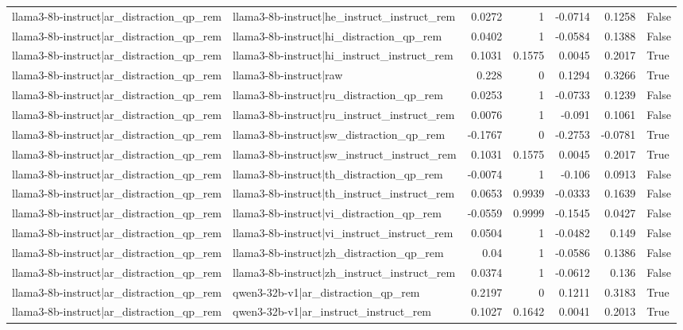 \begin{table}
\begin{tabular}{l l r r r r l}
llama3-8b-instruct|ar_distraction_qp_rem & llama3-8b-instruct|he_instruct_instruct_rem & 0.0272 & 1 & -0.0714 & 0.1258 & False \\
llama3-8b-instruct|ar_distraction_qp_rem & llama3-8b-instruct|hi_distraction_qp_rem & 0.0402 & 1 & -0.0584 & 0.1388 & False \\
llama3-8b-instruct|ar_distraction_qp_rem & llama3-8b-instruct|hi_instruct_instruct_rem & 0.1031 & 0.1575 & 0.0045 & 0.2017 & True \\
llama3-8b-instruct|ar_distraction_qp_rem & llama3-8b-instruct|raw & 0.228 & 0 & 0.1294 & 0.3266 & True \\
llama3-8b-instruct|ar_distraction_qp_rem & llama3-8b-instruct|ru_distraction_qp_rem & 0.0253 & 1 & -0.0733 & 0.1239 & False \\
llama3-8b-instruct|ar_distraction_qp_rem & llama3-8b-instruct|ru_instruct_instruct_rem & 0.0076 & 1 & -0.091 & 0.1061 & False \\
llama3-8b-instruct|ar_distraction_qp_rem & llama3-8b-instruct|sw_distraction_qp_rem & -0.1767 & 0 & -0.2753 & -0.0781 & True \\
llama3-8b-instruct|ar_distraction_qp_rem & llama3-8b-instruct|sw_instruct_instruct_rem & 0.1031 & 0.1575 & 0.0045 & 0.2017 & True \\
llama3-8b-instruct|ar_distraction_qp_rem & llama3-8b-instruct|th_distraction_qp_rem & -0.0074 & 1 & -0.106 & 0.0913 & False \\
llama3-8b-instruct|ar_distraction_qp_rem & llama3-8b-instruct|th_instruct_instruct_rem & 0.0653 & 0.9939 & -0.0333 & 0.1639 & False \\
llama3-8b-instruct|ar_distraction_qp_rem & llama3-8b-instruct|vi_distraction_qp_rem & -0.0559 & 0.9999 & -0.1545 & 0.0427 & False \\
llama3-8b-instruct|ar_distraction_qp_rem & llama3-8b-instruct|vi_instruct_instruct_rem & 0.0504 & 1 & -0.0482 & 0.149 & False \\
llama3-8b-instruct|ar_distraction_qp_rem & llama3-8b-instruct|zh_distraction_qp_rem & 0.04 & 1 & -0.0586 & 0.1386 & False \\
llama3-8b-instruct|ar_distraction_qp_rem & llama3-8b-instruct|zh_instruct_instruct_rem & 0.0374 & 1 & -0.0612 & 0.136 & False \\
llama3-8b-instruct|ar_distraction_qp_rem & qwen3-32b-v1|ar_distraction_qp_rem & 0.2197 & 0 & 0.1211 & 0.3183 & True \\
llama3-8b-instruct|ar_distraction_qp_rem & qwen3-32b-v1|ar_instruct_instruct_rem & 0.1027 & 0.1642 & 0.0041 & 0.2013 & True \\

\end{tabular}
\end{table}

